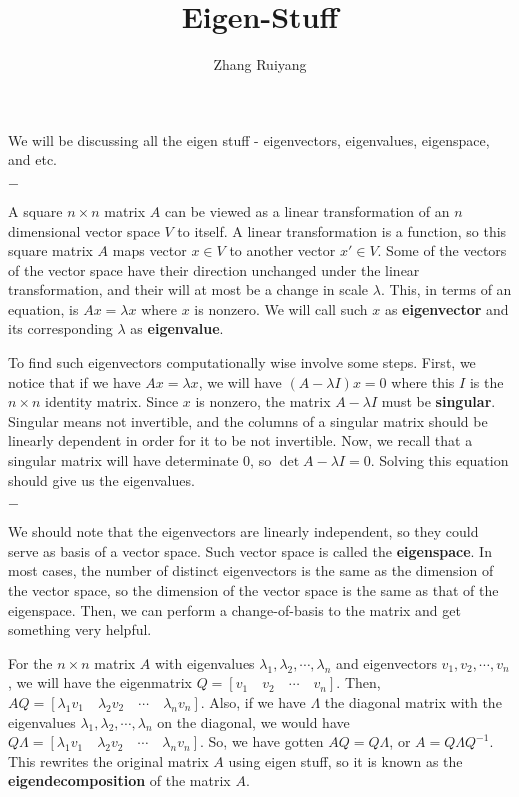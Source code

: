 \documentclass{article}
\title{Eigen-Stuff}
\author{Zhang Ruiyang}
\date{}
\theoremstyle{definition}
\newcommand{\breaking}{%
    \begin{center}
    $-$
    \end{center}%
}
\begin{document}
\maketitle

\noindent We will be discussing all the eigen stuff - eigenvectors, eigenvalues, eigenspace, and etc.

\breaking

\noindent A square $n \times n$ matrix $A$ can be viewed as a linear transformation of an $n$ dimensional vector space $V$ to itself. A linear transformation is a function, so this square matrix $A$ maps vector $x \in V$ to another vector $x' \in V$. Some of the vectors of the vector space have their direction unchanged under the linear transformation, and their will at most be a change in scale $\lambda$. This, in terms of an equation, is $Ax = \lambda x$ where $x$ is nonzero. We will call such $x$ as \textbf{eigenvector} and its corresponding $\lambda$ as \textbf{eigenvalue}. 

\bigskip

\noindent To find such eigenvectors computationally wise involve some steps. First, we notice that if we have $Ax = \lambda x$, we will have $(A - \lambda I) x = 0$ where this $I$ is the $n \times n$ identity matrix. Since $x$ is nonzero, the matrix $A - \lambda I$ must be \textbf{singular}. Singular means not invertible, and the columns of a singular matrix should be linearly dependent in order for it to be not invertible. Now, we recall that a singular matrix will have determinate 0, so $\det{A - \lambda I} = 0$. Solving this equation should give us the eigenvalues. 

\breaking

\noindent We should note that the eigenvectors are linearly independent, so they could serve as basis of a vector space. Such vector space is called the \textbf{eigenspace}. In most cases, the number of distinct eigenvectors is the same as the dimension of the vector space, so the dimension of the vector space is the same as that of the eigenspace. Then, we can perform a change-of-basis to the matrix and get something very helpful.

\bigskip

\noindent For the $n \times n$ matrix $A$ with eigenvalues $\lambda_1, \lambda_2, \cdots, \lambda_n$ and eigenvectors $v_1, v_2, \cdots, v_n$, we will have the eigenmatrix $Q = [ v_1 \quad v_2 \quad \cdots \quad v_n ]$. Then, $AQ = [ \lambda_1 v_1 \quad \lambda_2 v_2 \quad \cdots \quad \lambda_n v_n ]$. Also, if we have $\Lambda$ the diagonal matrix with the eigenvalues $\lambda_1, \lambda_2, \cdots, \lambda_n$ on the diagonal, we would have $Q \Lambda = [ \lambda_1 v_1 \quad \lambda_2 v_2 \quad \cdots \quad \lambda_n v_n ]$. So, we have gotten $AQ = Q\Lambda$, or $A = Q \Lambda Q^{-1}$. This rewrites the original matrix $A$ using eigen stuff, so it is known as the \textbf{eigendecomposition} of the matrix $A$.
\end{document}
